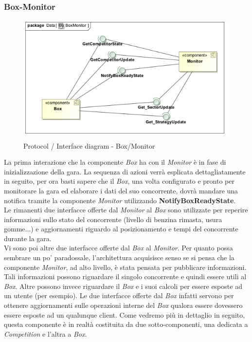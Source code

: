 \subsubsection{Box-Monitor}
\begin{center}
\begin{figure}[h!]
	\includegraphics[scale=0.55]{img/InteractionDiagram/Implementation_Diagram__BoxMonitor.jpg}
\caption{Protocol / Interface diagram - Box/Monitor}
\end{figure}
\end{center}
La prima interazione che la componente \emph{Box} ha con il \emph{Monitor} \`{e} in fase di inizializzazione della gara. 
La sequenza di azioni verr\`{a} esplicata
dettagliatamente in seguito, per ora basti sapere che il \emph{Box}, una volta configurato e pronto per monitorare 
la gara ed elaborare i dati del suo
concorrente, dovr\`{a} mandare una notifica tramite la componente \emph{Monitor} utilizzando \textbf{NotifyBoxReadyState}.\\
Le rimanenti due interfacce offerte dal \emph{Monitor} al \emph{Box} sono utilizzate per reperire informazioni sullo stato del 
concorrente (livello di benzina rimasta, usura gomme...) e
aggiornamenti riguardo al posizionamento e tempi del concorrente durante la gara.\\
Vi sono poi altre due interfacce offerte dal \emph{Box} al \emph{Monitor}. Per quanto possa sembrare un po' paradossale, l'architettura
acquisisce senso se si pensa che la componente \emph{Monitor}, ad alto livello, \`{e} stata pensata per pubblicare informazioni. Tali
informazioni possono riguardare il singolo concorrente e quindi essere utili al \emph{Box}. Altre possono invece riguardare il \emph{Box} e 
i suoi calcoli per essere esposte ad un utente (per esempio). Le due interfacce offerte dal \emph{Box} infatti servono per ottenere
aggiornamenti sulle operazioni interne del \emph{Box} qualora essere dovessero essere esposte ad un qualunque client. Come vedremo pi\`{u}
in dettaglio in seguito, questa componente \`{e} in realt\`{a} costituita da due sotto-componenti, una dedicata a \emph{Competition} e l'altra a
\emph{Box}.
